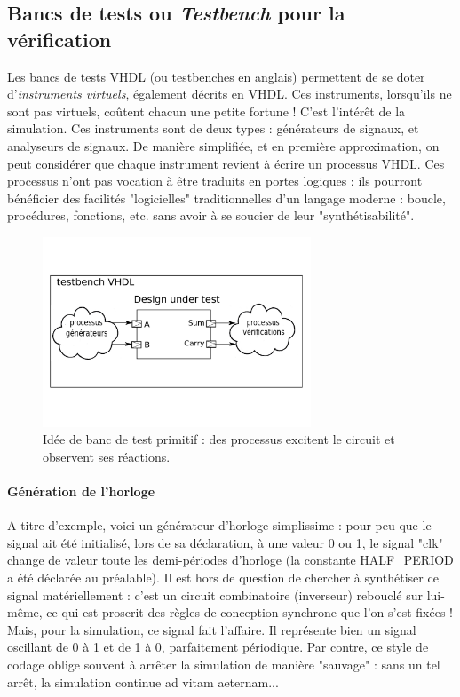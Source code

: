 \subsection{Bancs de tests ou {\it Testbench} pour la vérification}

Les bancs de tests VHDL (ou testbenches en anglais) permettent de se doter d'{\it instruments virtuels}, également décrits en VHDL.
Ces instruments, lorsqu'ils ne sont pas virtuels, coûtent chacun une petite fortune ! C'est l'intérêt de la simulation.
Ces instruments sont de deux types : générateurs de signaux, et analyseurs de signaux. De manière simplifiée, et en première approximation,
on peut considérer que chaque instrument revient à écrire un processus VHDL. Ces processus n'ont pas vocation à être traduits en portes logiques : ils
pourront bénéficier des facilités "logicielles" traditionnelles d'un langage moderne : boucle, procédures, fonctions, etc. sans avoir à se soucier
de leur "synthétisabilité".

\begin{figure}[!t]
  \centering
  \includegraphics[width=8cm]{./figures/testbench.png}
  \caption{Idée de banc de test primitif : des processus excitent le circuit et observent ses réactions.}
  \label{tb}
\end{figure}

\paragraph{Génération de l'horloge}
A titre d'exemple, voici un générateur d'horloge simplissime : pour peu que le signal ait été initialisé, lors de sa déclaration, à une valeur 0 ou 1,
le signal "clk" change de valeur toute les demi-périodes d'horloge (la constante HALF\_PERIOD a été déclarée au préalable). Il est hors de question de
chercher à synthétiser ce signal matériellement : c'est un circuit combinatoire (inverseur) rebouclé sur lui-même, ce qui est proscrit des règles
de conception synchrone que l'on s'est fixées ! Mais, pour la simulation, ce signal fait l'affaire. Il représente bien un signal oscillant de 0 à 1 et de 1 à 0, parfaitement
périodique. Par contre, ce style de codage oblige souvent à arrêter la simulation de manière "sauvage" : sans un tel arrêt, la simulation continue ad vitam aeternam...


